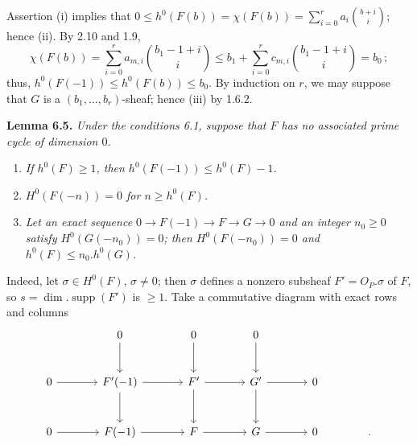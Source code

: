 Assertion (i) implies that \(0\le h^0(F(b))=\chi(F(b))=\sum_{i=0}^{r}a_i\binom{b+i}{i}\); hence (ii). By 2.10 and 1.9,
\[
   \chi(F(b))=\sum_{i=0}^{r} a_{m,i}\binom{b_1-1+i}{i}\le b_1+\sum_{i=0}^{r} c_{m,i}\binom{b_1-1+i}{i}=b_0\,;
\]
thus, $h^0(F(-1))\le h^0(F(b))\le b_0$. By induction on $r$, we may suppose that $G$ is a $(b_1,\ldots,b_r)$-sheaf; hence (iii) by 1.6.2.

\textbf{Lemma 6.5.} \emph{Under the conditions 6.1, suppose that $F$ has no associated prime cycle of dimension $0$.}
\begin{enumerate}[label=(\roman*)]
\item \emph{If $h^0(F)\ge1$, then $h^0(F(-1))\le h^0(F)-1$.}
\item \emph{$H^0(F(-n))=0$ for $n\ge h^0(F)$.}
\item \emph{Let an exact sequence $0\to F(-1)\to F\to G\to0$ and an integer $n_0\ge0$ satisfy $H^0(G(-n_0))=0$; then $H^0(F(-n_0))=0$ and $h^0(F)\le n_0.h^0(G)$.}
\end{enumerate}
Indeed, let $\sigma\in H^0(F)$, $\sigma\ne0$; then $\sigma$ defines a nonzero subsheaf $F'={O}_P.\sigma$ of $F$, so $s=\dim.\operatorname{supp}(F')$ is $\ge1$. Take a commutative diagram with exact rows and columns
\[
\begin{tikzcd}[column sep=large,row sep=large]
&0 \arrow[d]&0 \arrow[d]&0 \arrow[d]&\\
0 \arrow[r]&F'(-1) \arrow[r] \arrow[d]&F' \arrow[r] \arrow[d]&G' \arrow[r] \arrow[d]&0\\
0 \arrow[r]&F(-1) \arrow[r]&F \arrow[r]&G \arrow[r]&0 & .
\end{tikzcd}
\]
